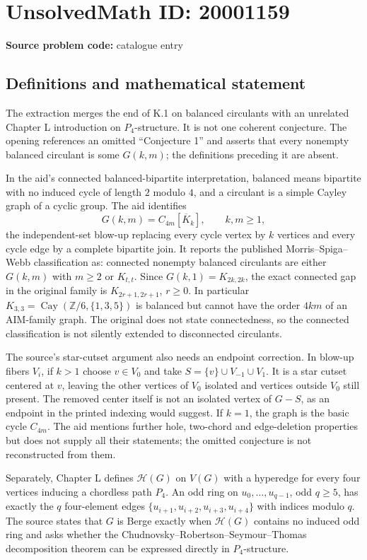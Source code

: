 \documentclass[11pt]{article}
\newcommand{\Z}{\mathbb{Z}}
\begin{document}
\section*{UnsolvedMath ID: 20001159}
\textbf{Source problem code:} catalogue entry
\subsection{Definitions and mathematical statement}
The extraction merges the end of K.1 on balanced circulants with an unrelated Chapter L introduction on $P_4$-structure. It is not one coherent conjecture. The opening references an omitted ``Conjecture 1'' and asserts that every nonempty balanced circulant is some $G(k,m)$; the definitions preceding it are absent.

In the aid's connected balanced-bipartite interpretation, balanced means bipartite with no induced cycle of length $2$ modulo $4$, and a circulant is a simple Cayley graph of a cyclic group. The aid identifies
\[
G(k,m)=C_{4m}[\overline K_k],\qquad k,m\ge1,
\]
the independent-set blow-up replacing every cycle vertex by $k$ vertices and every cycle edge by a complete bipartite join. It reports the published Morris--Spiga--Webb classification as: connected nonempty balanced circulants are either $G(k,m)$ with $m\ge2$ or $K_{t,t}$. Since $G(k,1)=K_{2k,2k}$, the exact connected gap in the original family is $K_{2r+1,2r+1}$, $r\ge0$. In particular $K_{3,3}=\operatorname{Cay}(\Z/6,\{1,3,5\})$ is balanced but cannot have the order $4km$ of an AIM-family graph. The original does not state connectedness, so the connected classification is not silently extended to disconnected circulants.

The source's star-cutset argument also needs an endpoint correction. In blow-up fibers $V_i$, if $k>1$ choose $v\in V_0$ and take $S=\{v\}\cup V_{-1}\cup V_1$. It is a star cutset centered at $v$, leaving the other vertices of $V_0$ isolated and vertices outside $V_0$ still present. The removed center itself is not an isolated vertex of $G-S$, as an endpoint in the printed indexing would suggest. If $k=1$, the graph is the basic cycle $C_{4m}$. The aid mentions further hole, two-chord and edge-deletion properties but does not supply all their statements; the omitted conjecture is not reconstructed from them.

Separately, Chapter L defines $\mathcal H(G)$ on $V(G)$ with a hyperedge for every four vertices inducing a chordless path $P_4$. An odd ring on $u_0,\ldots,u_{q-1}$, odd $q\ge5$, has exactly the $q$ four-element edges $\{u_{i+1},u_{i+2},u_{i+3},u_{i+4}\}$ with indices modulo $q$. The source states that $G$ is Berge exactly when $\mathcal H(G)$ contains no induced odd ring and asks whether the Chudnovsky--Robertson--Seymour--Thomas decomposition theorem can be expressed directly in $P_4$-structure.
\end{document}
